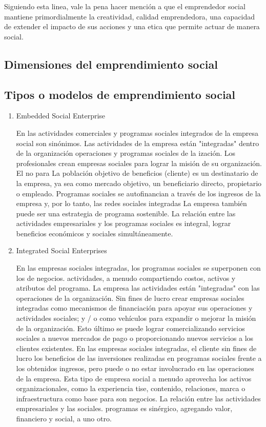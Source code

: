 \documentclass{memoir}
\begin{document}
Siguiendo esta linea, vale la pena hacer mención a que el emprendedor social mantiene primordialmente la creatividad, calidad emprendedora, una capacidad de extender el impacto de sus acciones y una etica que permite actuar de manera social. 

\subsection{Dimensiones del emprendimiento social}
\label{sec:org4802581}


\subsection{Tipos o modelos de emprendimiento social}
\label{sec:orgfdc2bf1}

\begin{enumerate}
\item Embedded Social Enterprise
\label{sec:org1cf01b6}

En las actividades comerciales y programas sociales integrados de la empresa social
son sinónimos. Las actividades de la empresa están "integradas" dentro de la organización
operaciones y programas sociales de la ización. Los profesionales crean
empresas sociales para lograr la misión de su organización. El no para
La población objetivo de beneficios (cliente) es un destinatario de la empresa, ya sea como
mercado objetivo, un beneficiario directo, propietario o empleado. Programas sociales
se autofinancian a través de los ingresos de la empresa y, por lo tanto, las redes sociales integradas
La empresa también puede ser una estrategia de programa sostenible. La relación
entre las actividades empresariales y los programas sociales es integral,
lograr beneficios económicos y sociales simultáneamente.

\item Integrated Social Enterprises
\label{sec:org3e4664e}

En las empresas sociales integradas, los programas sociales se superponen con los de negocios.
actividades, a menudo compartiendo costos, activos y atributos del programa. La empresa
las actividades están "integradas" con las operaciones de la organización. Sin fines de lucro
crear empresas sociales integradas como mecanismos de financiación para apoyar sus
operaciones y actividades sociales; y / o como vehículos para expandir o mejorar
la misión de la organización. Esto último se puede lograr comercializando
servicios sociales a nuevos mercados de pago o proporcionando nuevos servicios
a los clientes existentes. En las empresas sociales integradas, el cliente sin fines de lucro
los beneficios de las inversiones realizadas en programas sociales frente a los obtenidos
ingresos, pero puede o no estar involucrado en las operaciones de la empresa. Esta
tipo de empresa social a menudo aprovecha los activos organizacionales, como la experiencia
tise, contenido, relaciones, marca o infraestructura como base para
son negocios. La relación entre las actividades empresariales y las sociales.
programas es sinérgico, agregando valor, financiero y social, a uno
otro.


\end{enumerate}
\end{document}
